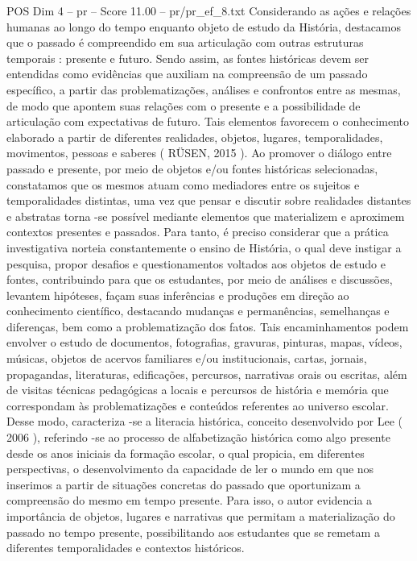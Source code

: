 \begin{textsample}{POS Dim 4 – pr – Score 11.00 – pr/pr\_ef\_8.txt}
Considerando as ações e relações humanas ao longo do tempo enquanto objeto de estudo da História, destacamos que o passado é compreendido em sua articulação com outras estruturas temporais : presente e futuro.
Sendo assim, as fontes históricas devem ser entendidas como evidências que auxiliam na compreensão de um passado específico, a partir das problematizações, análises e confrontos entre as mesmas, de modo que apontem suas relações com o presente e a possibilidade de articulação com expectativas de futuro.
Tais elementos favorecem o conhecimento elaborado a partir de diferentes realidades, objetos, lugares, temporalidades, movimentos, pessoas e saberes ( RÜSEN, 2015 ).
Ao promover o diálogo entre passado e presente, por meio de objetos e/ou fontes históricas selecionadas, constatamos que os mesmos atuam como mediadores entre os sujeitos e temporalidades distintas, uma vez que pensar e discutir sobre realidades distantes e abstratas torna -se possível mediante elementos que materializem e aproximem contextos presentes e passados.
Para tanto, é preciso considerar que a prática investigativa norteia constantemente o ensino de História, o qual deve instigar a pesquisa, propor desafios e questionamentos voltados aos objetos de estudo e fontes, contribuindo para que os estudantes, por meio de análises e discussões, levantem hipóteses, façam suas inferências e produções em direção ao conhecimento científico, destacando mudanças e permanências, semelhanças e diferenças, bem como a problematização dos fatos.
Tais encaminhamentos podem envolver o estudo de documentos, fotografias, gravuras, pinturas, mapas, vídeos, músicas, objetos de acervos familiares e/ou institucionais, cartas, jornais, propagandas, literaturas, edificações, percursos, narrativas orais ou escritas, além de visitas técnicas pedagógicas a locais e percursos de história e memória que correspondam às problematizações e conteúdos referentes ao universo escolar.
Desse modo, caracteriza -se a literacia histórica, conceito desenvolvido por Lee ( 2006 ), referindo -se ao processo de alfabetização histórica como algo presente desde os anos iniciais da formação escolar, o qual propicia, em diferentes perspectivas, o desenvolvimento da capacidade de ler o mundo em que nos inserimos a partir de situações concretas do passado que oportunizam a compreensão do mesmo em tempo presente.
Para isso, o autor evidencia a importância de objetos, lugares e narrativas que permitam a materialização do passado no tempo presente, possibilitando aos estudantes que se remetam a diferentes temporalidades e contextos históricos.

\end{textsample}
